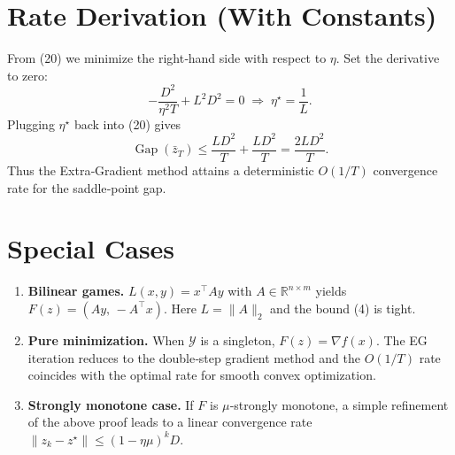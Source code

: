 \documentclass{article}
\newcommand{\gap}{\operatorname{Gap}}
\begin{document}
\section*{Rate Derivation (With Constants)}
From (20) we minimize the right‑hand side with respect to $\eta$.
Set the derivative to zero:
\[
-\frac{D^{2}}{\eta^{2}T}+L^{2}D^{2}=0
\;\Longrightarrow\;
\eta^{\star}=\frac{1}{L}.
\]
Plugging $\eta^{\star}$ back into (20) gives
\[
\gap(\bar z_{T})\le\frac{LD^{2}}{T}+ \frac{LD^{2}}{T}
               =\frac{2LD^{2}}{T}.
\]
Thus the Extra‑Gradient method attains a deterministic $O(1/T)$
convergence rate for the saddle‑point gap.

\section*{Special Cases}
\begin{enumerate}[label=(\alph*)]
\item \textbf{Bilinear games.} $L(x,y)=x^{\top}Ay$ with $A\in\mathbb R^{n\times m}$
    yields $F(z)=(Ay,\,-A^{\top}x)$. Here $L=\|A\|_{2}$ and the bound (4) is tight.
\item \textbf{Pure minimization.} When $\mathcal Y$ is a singleton, $F(z)=\nabla f(x)$.
    The EG iteration reduces to the double‑step gradient method and the
    $O(1/T)$ rate coincides with the optimal rate for smooth convex optimization.
\item \textbf{Strongly monotone case.} If $F$ is $\mu$‑strongly monotone,
    a simple refinement of the above proof leads to a linear convergence
    rate $\|z_{k}-z^{\star}\|\le(1-\eta\mu)^{k}D$.
\end{enumerate}
\end{document}
